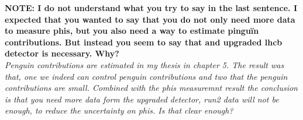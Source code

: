 \textbf{NOTE: I do not understand what you try to say in the last sentence. I expected that you wanted to
 say that you do not only need more data to measure phis, but you also need a way to estimate pingu\"in
 contributions. But instead you seem to say that and upgraded lhcb detector is necessary.  Why?}\\

{\color{green}\it Penguin contributions are estimated in my thesis in chapter 5.
The result was that, one we indeed can control penguin contributions and two that the penguin contributions
are small. Combined with the phis measuremnt result the conclusion is that you need more data form the upgraded
 detector, run2 data will  not be enough, to reduce the uncertainty on phis. Is that clear enough?    }\\ 

%
%
%
